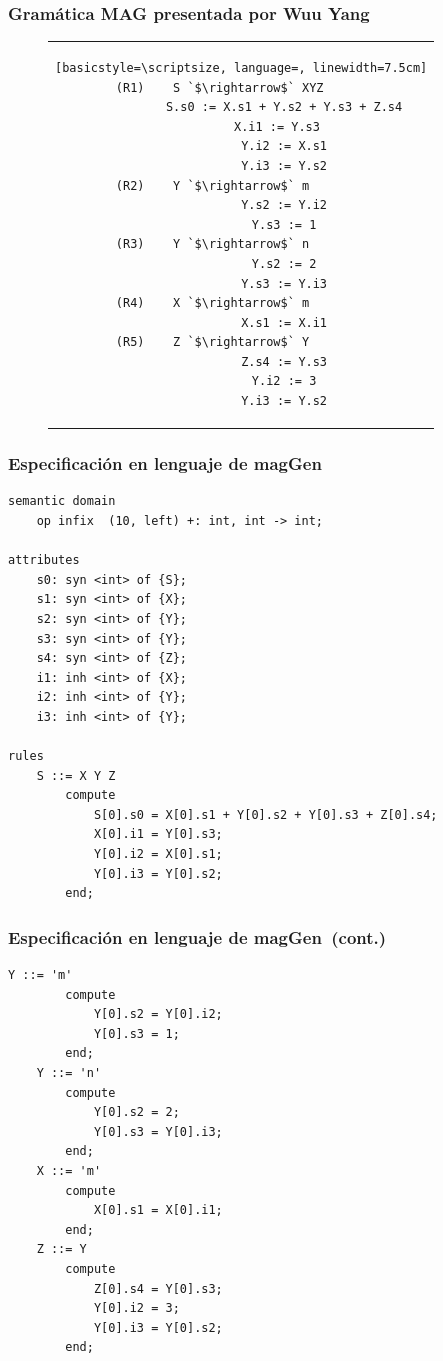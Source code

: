 \documentclass[10pt]{beamer}
\newcommand{\maggen}{\textbf{magGen}}
\begin{document}
\begin{frame}[fragile]
\frametitle{Gramática MAG presentada por Wuu Yang}
\begin{figure}[h]
\begin{center}
\begin{tabular}{c}
\begin{lstlisting}[basicstyle=\scriptsize, language=, linewidth=7.5cm]
(R1)    S `$\rightarrow$` XYZ      
            S.s0 := X.s1 + Y.s2 + Y.s3 + Z.s4
            X.i1 := Y.s3  
            Y.i2 := X.s1
            Y.i3 := Y.s2
(R2)    Y `$\rightarrow$` m        
            Y.s2 := Y.i2
            Y.s3 := 1
(R3)    Y `$\rightarrow$` n        
            Y.s2 := 2
            Y.s3 := Y.i3
(R4)    X `$\rightarrow$` m        
            X.s1 := X.i1
(R5)    Z `$\rightarrow$` Y        
            Z.s4 := Y.s3
            Y.i2 := 3
            Y.i3 := Y.s2
\end{lstlisting} 
\end{tabular}
\end{center}
\end{figure}
\end{frame}


\begin{frame}[fragile]
\frametitle{Especificación en lenguaje de \maggen}

\begin{lstlisting}[basicstyle=\scriptsize, language=specmag, linewidth=10cm]
semantic domain
    op infix  (10, left) +: int, int -> int;

attributes
    s0: syn <int> of {S};
    s1: syn <int> of {X};
    s2: syn <int> of {Y};
    s3: syn <int> of {Y};
    s4: syn <int> of {Z};
    i1: inh <int> of {X};
    i2: inh <int> of {Y};
    i3: inh <int> of {Y};

rules
    S ::= X Y Z
        compute
            S[0].s0 = X[0].s1 + Y[0].s2 + Y[0].s3 + Z[0].s4;
            X[0].i1 = Y[0].s3;
            Y[0].i2 = X[0].s1;
            Y[0].i3 = Y[0].s2;
        end;
\end{lstlisting}
\end{frame}


\begin{frame}[fragile]
\frametitle{Especificación en lenguaje de \maggen\ (cont.)}

\begin{lstlisting}[basicstyle=\scriptsize, language=specmag, linewidth=10cm]
    Y ::= 'm'
        compute
            Y[0].s2 = Y[0].i2;
            Y[0].s3 = 1;
        end;
    Y ::= 'n'
        compute
            Y[0].s2 = 2;
            Y[0].s3 = Y[0].i3;
        end;
    X ::= 'm'
        compute
            X[0].s1 = X[0].i1;
        end;
    Z ::= Y
        compute
            Z[0].s4 = Y[0].s3;
            Y[0].i2 = 3;
            Y[0].i3 = Y[0].s2;
        end;


\end{lstlisting}

\end{frame}
\end{document}
